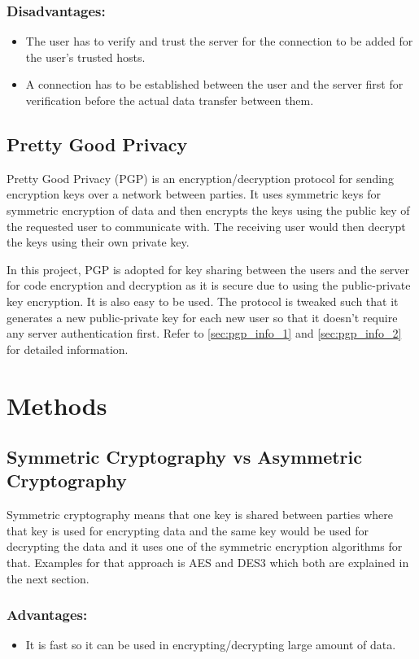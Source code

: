 \subsubsection{Disadvantages:}
\begin{itemize}
    \item The user has to verify and trust the server for the connection to be added for the user's trusted hosts.
    \item A connection has to be established between the user and the server first for verification before the actual data transfer between them.
\end{itemize}

\subsection{Pretty Good Privacy}
Pretty Good Privacy (PGP) is an encryption/decryption protocol for sending encryption keys over a network between parties. It uses symmetric keys for symmetric encryption of data and then encrypts the keys using the public key of the requested user to communicate with. The receiving user would then decrypt the keys using their own private key.

In this project, PGP is adopted for key sharing between the users and the server for code encryption and decryption as it is secure due to using the public-private key encryption. It is also easy to be used. The protocol is tweaked such that it generates a new public-private key for each new user so that it doesn't require any server authentication first. Refer to \ref{sec:pgp_info_1} and \ref{sec:pgp_info_2} for detailed information.

\section{Methods}

\subsection{Symmetric Cryptography vs Asymmetric Cryptography}
Symmetric cryptography means that one key is shared between parties where that key is used for encrypting data and the same key would be used for decrypting the data and it uses one of the symmetric encryption algorithms for that. Examples for that approach is AES and DES3 which both are explained in the next section.

\subsubsection{Advantages:}
\begin{itemize}
    \item It is fast so it can be used in encrypting/decrypting large amount of data.
\end{itemize}

